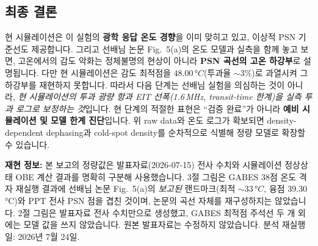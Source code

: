 \documentclass[10pt,a4paper]{article}
\providecommand{\SensitivityOptimumTemperatureC}{48.00}
\providecommand{\GabesOptimumTransmissionPct}{3}
\providecommand{\PaperPSNOptimumC}{33}
\providecommand{\RbMeltingC}{39.30}
\providecommand{\EITLinewidthMHz}{1.6}
\begin{document}
\subsection*{최종 결론}

현 시뮬레이션은 이 실험의 \textbf{광학 응답 온도 경향}을 이미 맞히고 있고, 이상적 PSN 기준선도 제공합니다.
그리고 선배님 논문 Fig.\ 5(a)의 온도 모델과 실측을 함께 놓고 보면, 고온에서의 감도 악화는 정체불명의
현상이 아니라 \textbf{PSN 곡선의 고온 하강부}로 설명됩니다. 다만 현 시뮬레이션은 감도 최적점을
\(\SensitivityOptimumTemperatureC\,°C\)(투과율 \(\sim\GabesOptimumTransmissionPct\%\))로 과열시켜
그 하강부를 재현하지 못합니다. 따라서 다음 단계는 선배님 실험을 의심하는 것이 아니라, \emph{현 시뮬레이션의
투과 광량 항과 EIT 선폭(\EITLinewidthMHz\,MHz, transit-time 한계)을 실측 투과 로그로 보정하는 것}입니다.
현 단계의 적절한 표현은 ``검증 완료''가 아니라 \textbf{예비 시뮬레이션 및 모델 한계 진단}입니다.
위 raw data와 온도 로그가 확보되면 density-dependent dephasing과 cold-spot density를 순차적으로 식별해
정량 모델로 확장할 수 있습니다.

\vfill
{\footnotesize
\textbf{재현 정보:} 본 보고의 정량값은 발표자료(2026-07-15) 전사 수치와 시뮬레이션 정상상태 OBE 계산
결과를 명확히 구분해 사용했습니다. 3절 그림은 GABES 38점 온도 격자 재실행 결과에 선배님 논문 Fig.\ 5(a)의
\emph{보고된} 랜드마크(최적 \(\sim\PaperPSNOptimumC\,°C\), 융점 \RbMeltingC\,°C)와 PPT 전사 PSN 점을
겹친 것이며, 논문의 곡선 자체를 재구성하지는 않았습니다. 2절 그림은 발표자료 전사 수치만으로 생성했고,
GABES 최적점 주석선 두 개 외에는 모델 값을 쓰지 않았습니다. 원본 발표자료는 수정하지 않았습니다.
분석 재실행일: 2026년 7월 24일.}
\end{document}
